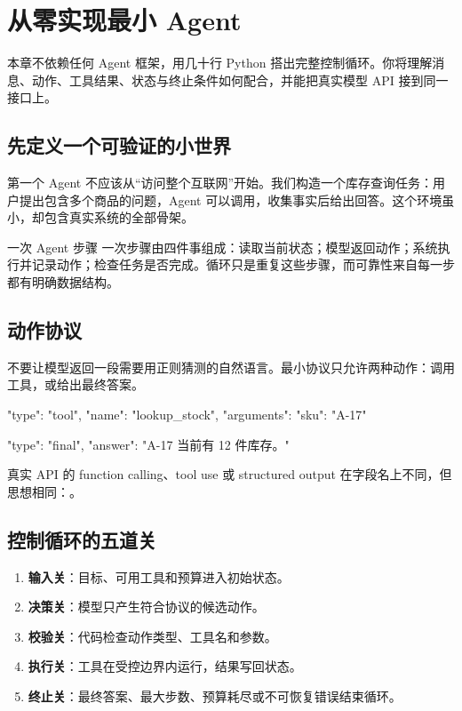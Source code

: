 \chapter{从零实现最小 Agent}
\label{chap:minimal-agent}

\begin{takeaway}[学习目标]
本章不依赖任何 Agent 框架，用几十行 Python 搭出完整控制循环。你将理解消息、动作、工具结果、状态与终止条件如何配合，并能把真实模型 API 接到同一接口上。
\end{takeaway}

\section{先定义一个可验证的小世界}

第一个 Agent 不应该从“访问整个互联网”开始。我们构造一个库存查询任务：用户提出包含多个商品的问题，Agent 可以调用，收集事实后给出回答。这个环境虽小，却包含真实系统的全部骨架。

\begin{definitionbox}{一次 Agent 步骤}
一次步骤由四件事组成：读取当前状态；模型返回动作；系统执行并记录动作；检查任务是否完成。循环只是重复这些步骤，而可靠性来自每一步都有明确数据结构。
\end{definitionbox}

\section{动作协议}

不要让模型返回一段需要用正则猜测的自然语言。最小协议只允许两种动作：调用工具，或给出最终答案。

\begin{codeblock}
{"type": "tool", "name": "lookup_stock",
 "arguments": {"sku": "A-17"}}

{"type": "final", "answer": "A-17 当前有 12 件库存。"}
\end{codeblock}

真实 API 的 function calling、tool use 或 structured output 在字段名上不同，但思想相同：。

\section{控制循环的五道关}

\begin{enumerate}
  \item \textbf{输入关}：目标、可用工具和预算进入初始状态。
  \item \textbf{决策关}：模型只产生符合协议的候选动作。
  \item \textbf{校验关}：代码检查动作类型、工具名和参数。
  \item \textbf{执行关}：工具在受控边界内运行，结果写回状态。
  \item \textbf{终止关}：最终答案、最大步数、预算耗尽或不可恢复错误结束循环。
\end{enumerate}

